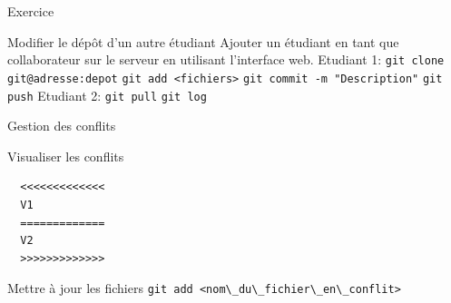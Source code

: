 \documentclass{beamer}
\begin{document}
\begin{frame}[fragile]{Exercice}
  \begin{exampleblock}{Modifier le dépôt d'un autre étudiant}
    Ajouter un étudiant en tant que collaborateur sur le serveur en utilisant l'interface web.\linebreak
    Etudiant 1:\linebreak
    \textcolor{commandcolor}{\verb?git clone git@adresse:depot?}\linebreak
    \linebreak
    \textcolor{commandcolor}{\verb?git add <fichiers>?}\linebreak
    \textcolor{commandcolor}{\verb?git commit -m "Description"?}\linebreak
    \textcolor{commandcolor}{\verb?git push?}\linebreak
    \linebreak
    Etudiant 2:\linebreak
    \textcolor{commandcolor}{\verb?git pull?}\linebreak
    \textcolor{commandcolor}{\verb?git log?}
  \end{exampleblock}
\end{frame}

\begin{frame}[fragile]{Gestion des conflits}
  \begin{block}{Visualiser les conflits}
\begin{verbatim}
  <<<<<<<<<<<<<
  V1
  =============
  V2
  >>>>>>>>>>>>>
\end{verbatim}
  \end{block}

  \begin{block}{Mettre à jour les fichiers}
    \textcolor{commandcolor}{\verb?git add <nom\_du\_fichier\_en\_conflit>?}
  \end{block}
\end{frame}
\end{document}
